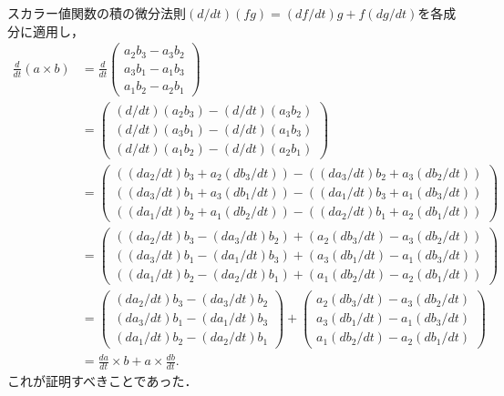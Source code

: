 
\begin{tproof}
  スカラー値関数の積の微分法則$(d/dt)(fg)=(df/dt)g+f(dg/dt)$を各成分に適用し，
  \begin{align*}
    \frac{d}{dt} (a \times b)
     & = \frac{d}{dt} \begin{pmatrix} a_2 b_3 - a_3 b_2 \\ a_3 b_1 - a_1 b_3 \\ a_1 b_2 - a_2 b_1 \end{pmatrix}                                                                                                                                            \\
     & = \begin{pmatrix} (d/dt)(a_2 b_3) - (d/dt)(a_3 b_2) \\ (d/dt)(a_3 b_1) - (d/dt)(a_1 b_3) \\ (d/dt)(a_1 b_2) - (d/dt)(a_2 b_1) \end{pmatrix}                                                                                                         \\
     & = \begin{pmatrix} ( (da_2/dt)b_3 + a_2(db_3/dt) ) - ( (da_3/dt)b_2 + a_3(db_2/dt) ) \\ ( (da_3/dt)b_1 + a_3(db_1/dt) ) - ( (da_1/dt)b_3 + a_1(db_3/dt) ) \\ ( (da_1/dt)b_2 + a_1(db_2/dt) ) - ( (da_2/dt)b_1 + a_2(db_1/dt) ) \end{pmatrix}         \\
     & = \begin{pmatrix} ( (da_2/dt)b_3 - (da_3/dt)b_2 ) + ( a_2(db_3/dt) - a_3(db_2/dt) ) \\ ( (da_3/dt)b_1 - (da_1/dt)b_3 ) + ( a_3(db_1/dt) - a_1(db_3/dt) ) \\ ( (da_1/dt)b_2 - (da_2/dt)b_1 ) + ( a_1(db_2/dt) - a_2(db_1/dt) ) \end{pmatrix}         \\
     & = \begin{pmatrix} (da_2/dt)b_3 - (da_3/dt)b_2 \\ (da_3/dt)b_1 - (da_1/dt)b_3 \\ (da_1/dt)b_2 - (da_2/dt)b_1 \end{pmatrix} + \begin{pmatrix} a_2(db_3/dt) - a_3(db_2/dt) \\ a_3(db_1/dt) - a_1(db_3/dt) \\ a_1(db_2/dt) - a_2(db_1/dt) \end{pmatrix} \\
     & = \frac{da}{dt} \times b + a \times \frac{db}{dt}.
  \end{align*}
  これが証明すべきことであった．
\end{tproof}

